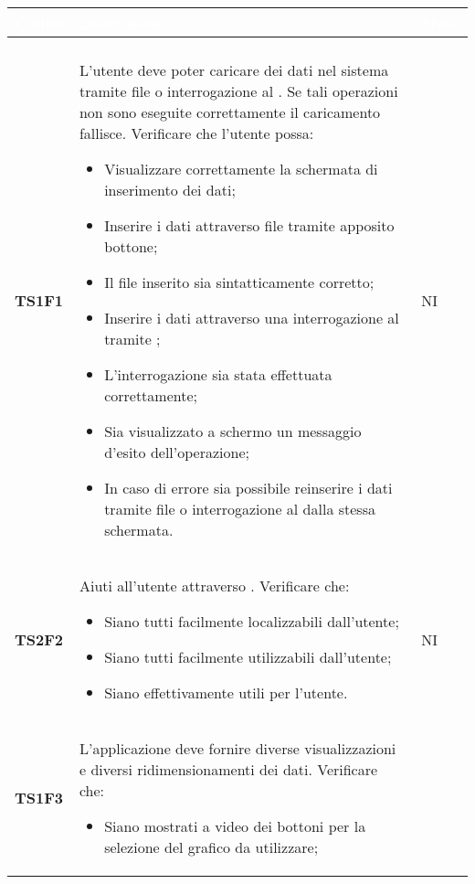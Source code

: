 \begin{longtable}{C{2cm} C{12cm} C{1.5cm}} 
		\textcolor{white}{\textbf{Codice}} & 
		\textcolor{white}{\textbf{Descrizione}} & 
		\textcolor{white}{\textbf{Stato}} \\
		\endfirsthead
		\\
	    \endfoot
	    \endlastfoot
		\hline
\textbf{TS1F1} & L'utente deve poter caricare dei dati nel sistema tramite file  o interrogazione al . Se tali operazioni non sono eseguite correttamente il caricamento fallisce. Verificare che l'utente possa: 
					\begin{itemize}
						\item Visualizzare correttamente la schermata di inserimento dei dati;
						\item Inserire i dati attraverso file  tramite apposito bottone;
						\item Il file  inserito sia sintatticamente corretto; 
						\item Inserire i dati attraverso una interrogazione al  tramite ;
						\item L'interrogazione sia stata effettuata correttamente;
						\item Sia visualizzato a schermo un messaggio d'esito dell'operazione;
						\item In caso di errore sia possibile reinserire i dati tramite file  o interrogazione al  dalla stessa schermata.
					\end{itemize}					 			    
			  & NI\\
\textbf{TS2F2} &  Aiuti all'utente attraverso . Verificare che:
					\begin{itemize}
						\item Siano tutti facilmente localizzabili dall'utente;
						\item Siano tutti facilmente utilizzabili dall'utente;
						\item Siano effettivamente utili per l'utente.
					\end{itemize}	
 			   & NI \\ 
\textbf{TS1F3} &  L'applicazione deve fornire diverse visualizzazioni e diversi ridimensionamenti dei dati. Verificare che: 
					\begin{itemize}
						\item Siano mostrati a video dei bottoni per la selezione del grafico da utilizzare;

\end{itemize}
\end{longtable}
